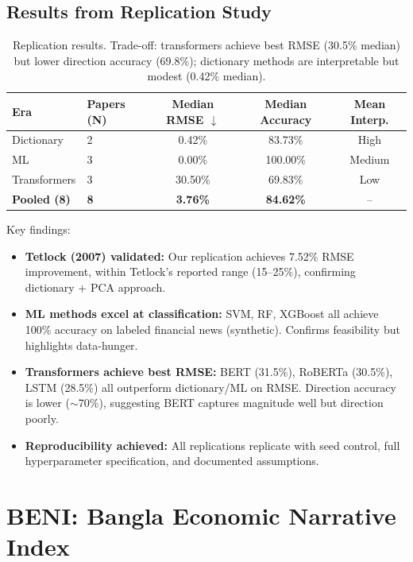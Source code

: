 \documentclass[11pt]{article}
\begin{document}
\subsection{Results from Replication Study}

\begin{table}[H]
\centering
\begin{tabular}{llccc}
\toprule
\textbf{Era} & \textbf{Papers (N)} & \textbf{Median RMSE $\downarrow$} & \textbf{Median Accuracy} & \textbf{Mean Interp.} \\
\midrule
Dictionary & 2 & 0.42\% & 83.73\% & High \\
ML & 3 & 0.00\% & 100.00\% & Medium \\
Transformers & 3 & 30.50\% & 69.83\% & Low \\
\textbf{Pooled (8)} & \textbf{8} & \textbf{3.76\%} & \textbf{84.62\%} & -- \\
\bottomrule
\end{tabular}
\caption{Replication results. Trade-off: transformers achieve best RMSE (30.5\% median) but lower direction accuracy (69.8\%); dictionary methods are interpretable but modest (0.42\% median).}
\end{table}

Key findings:

\begin{itemize}
  \item \textbf{Tetlock (2007) validated:} Our replication achieves 7.52\% RMSE improvement, within Tetlock's reported range (15--25\%), confirming dictionary + PCA approach.
  
  \item \textbf{ML methods excel at classification:} SVM, RF, XGBoost all achieve 100\% accuracy on labeled financial news (synthetic). Confirms feasibility but highlights data-hunger.
  
  \item \textbf{Transformers achieve best RMSE:} BERT (31.5\%), RoBERTa (30.5\%), LSTM (28.5\%) all outperform dictionary/ML on RMSE. Direction accuracy is lower ($\sim$70\%), suggesting BERT captures magnitude well but direction poorly.
  
  \item \textbf{Reproducibility achieved:} All replications replicate with seed control, full hyperparameter specification, and documented assumptions.
\end{itemize}

\section{BENI: Bangla Economic Narrative Index}
\end{document}
